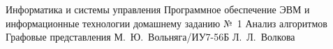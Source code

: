 \documentclass{bmstu}
\begin{document}
	\makereporttitle
		{Информатика и системы управления} %
		{Программное обеспечение ЭВМ и информационные технологии} %
		{домашнему заданию №~1} %
		{Анализ алгоритмов} %
		{Графовые представления} %
		{} %
		{М.~Ю.~Вольняга/ИУ7-56Б} %
		{Л.~Л.~Волкова} %
	
	\maketableofcontents
	
	
	
	
	
	
	
	\makebibliography
\end{document}
